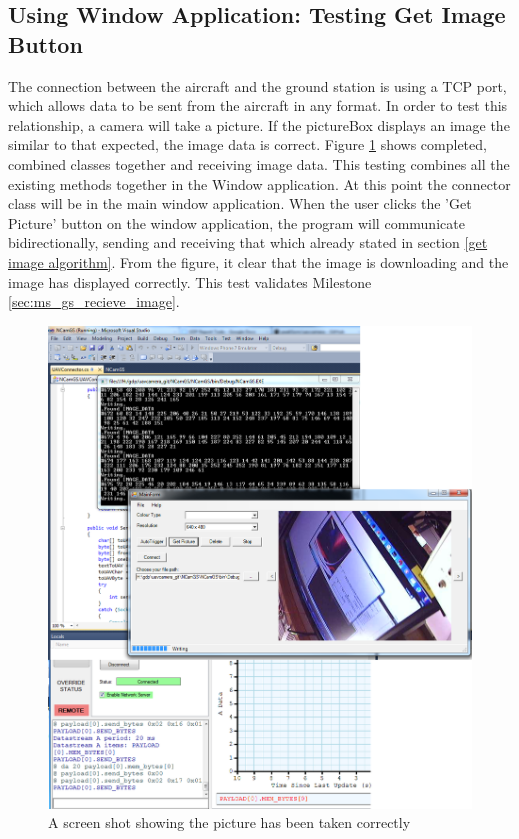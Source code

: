 \subsection{Using Window Application: Testing Get Image Button}
\label{sec:test_get_image_button}
The connection between the aircraft and the ground station is using a TCP port, which allows data to be sent from the aircraft in any format. 
In order to test this relationship, a camera will take a picture. 
If the pictureBox displays an image the similar to that expected, the image data is correct.
Figure \ref{camera testing1} shows completed, combined classes together and receiving image data.
This testing combines all the existing methods together in the Window application.
At this point the connector class will be in the main window application.
When the user clicks the 'Get Picture' button on the window application, the program will communicate bidirectionally, sending and receiving that which already stated in section \ref{get image algorithm}. 
From the figure, it clear that the image is downloading and the image has displayed correctly. This test validates Milestone \ref{sec:ms_gs_recieve_image}. 
\begin{figure}[H]
\begin{center}
\includegraphics[width=1.00\textwidth]{testing_screenshots/cam_test_11.png} 
\end{center}
\caption{A screen shot showing the picture has been taken correctly\label {camera testing1}}
\end{figure}

